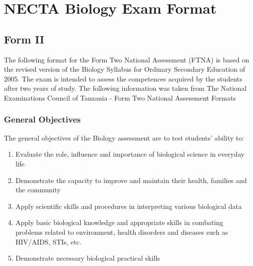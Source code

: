 \section{NECTA Biology Exam Format}
\label{sec:biology-format}

\subsection{Form II}
\noindent The following format for the Form Two National Assessment (FTNA) is based on the revised version of the Biology Syllabus for Ordinary Secondary Education of 2005. The exam is intended to assess the competences acquired by the students after two years of study. The following information was taken from The National Examinations Council of Tanzania - Form Two National Assessment Formats %

\subsubsection{General Objectives}
\noindent The general objectives of the Biology assessment are to test students' ability to:
\begin{enumerate}[topsep=1ex,itemsep=0ex,partopsep=1ex,parsep=1ex]
	\item Evaluate the role, influence and importance of biological science in everyday life
	\item Demonstrate the capacity to improve and maintain their health, families and the community
	\item Apply scientific skills and procedures in interpreting various biological data
	\item Apply basic biological knowledge and appropriate skills in combating problems related to environment, health disorders and diseases such as HIV/AIDS, STIs, etc. 
	\item Demonstrate necessary biological practical skills
\end{enumerate}

